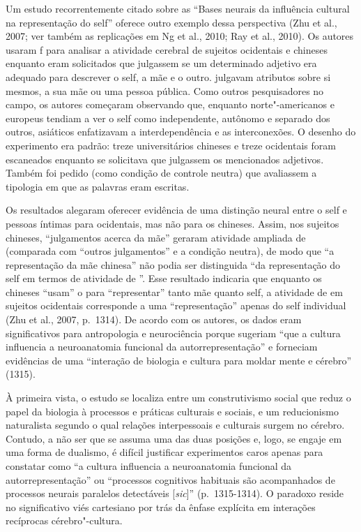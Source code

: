 Um estudo recorrentemente citado sobre as ``Bases neurais da influência
cultural na representação do self'' oferece outro exemplo dessa
perspectiva (Zhu et al., 2007; ver também as replicações em Ng et al.,
2010; Ray et al., 2010). Os autores usaram f para analisar a
atividade cerebral de sujeitos ocidentais e chineses enquanto eram
solicitados que julgassem se um determinado adjetivo era adequado para
descrever o self, a mãe e o outro. julgavam atributos sobre si mesmos, a
sua mãe ou uma pessoa pública. Como outros pesquisadores no campo, os
autores começaram observando que, enquanto norte"-americanos e europeus
tendiam a ver o self como independente, autônomo e separado dos outros,
asiáticos enfatizavam a interdependência e as interconexões. O desenho
do experimento era padrão: treze universitários chineses e treze
ocidentais foram escaneados enquanto se solicitava que julgassem os
mencionados adjetivos. Também foi pedido (como condição de controle
neutra) que avaliassem a tipologia em que as palavras eram escritas.

Os resultados alegaram oferecer evidência de uma distinção neural entre
o self e pessoas íntimas para ocidentais, mas não para os chineses.
Assim, nos sujeitos chineses, ``julgamentos acerca da mãe'' geraram
atividade ampliada de  (comparada com ``outros julgamentos'' e a
condição neutra), de modo que ``a representação da mãe chinesa'' não
podia ser distinguida ``da representação do self em termos de atividade
de ''. Esse resultado indicaria que enquanto os chineses ``usam'' o
 para ``representar'' tanto mãe quanto self, a atividade de  em
sujeitos ocidentais corresponde a uma ``representação'' apenas do self
individual (Zhu et al., 2007, p.~1314). De acordo com os autores, os
dados eram significativos para antropologia e neurociência porque
sugeriam ``que a cultura influencia a neuroanatomia funcional da
autorrepresentação'' e forneciam evidências de uma ``interação de
biologia e cultura para moldar mente e cérebro'' (1315).

À primeira vista, o estudo se localiza entre um construtivismo social
que reduz o papel da biologia à processos e práticas culturais e
sociais, e um reducionismo naturalista segundo o qual relações
interpessoais e culturais surgem no cérebro. Contudo, a não ser que se
assuma uma das duas posições e, logo, se engaje em uma forma de
dualismo, é difícil justificar experimentos caros apenas para constatar
como ``a cultura influencia a neuroanatomia funcional da
autorrepresentação'' ou ``processos cognitivos habituais são
acompanhados de processos neurais paralelos detectáveis
{[}\emph{sic}{]}'' (p.~1315-1314). O paradoxo reside no significativo
viés cartesiano por trás da ênfase explícita em interações recíprocas
cérebro"-cultura.


